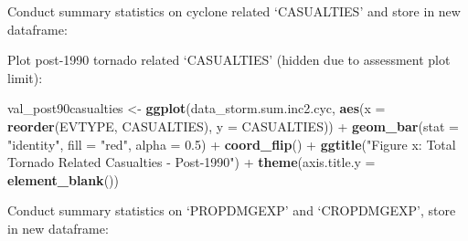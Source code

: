 \documentclass[]{article}
\newenvironment{Shaded}{\begin{snugshade}}{\end{snugshade}}
\newcommand{\KeywordTok}[1]{\textcolor[rgb]{0.13,0.29,0.53}{\textbf{{#1}}}}
\newcommand{\DataTypeTok}[1]{\textcolor[rgb]{0.13,0.29,0.53}{{#1}}}
\newcommand{\DecValTok}[1]{\textcolor[rgb]{0.00,0.00,0.81}{{#1}}}
\newcommand{\FloatTok}[1]{\textcolor[rgb]{0.00,0.00,0.81}{{#1}}}
\newcommand{\StringTok}[1]{\textcolor[rgb]{0.31,0.60,0.02}{{#1}}}
\newcommand{\OtherTok}[1]{\textcolor[rgb]{0.56,0.35,0.01}{{#1}}}
\newcommand{\NormalTok}[1]{{#1}}
\begin{document}
Conduct summary statistics on cyclone related `CASUALTIES' and store in
new dataframe:

\begin{Shaded}
\end{Shaded}

Plot post-1990 tornado related `CASUALTIES' (hidden due to assessment
plot limit):

\begin{Shaded}
\begin{Highlighting}[]
\NormalTok{val_post90casualties <-}\StringTok{ }\KeywordTok{ggplot}\NormalTok{(data_storm.sum.inc2.cyc, }\KeywordTok{aes}\NormalTok{(}\DataTypeTok{x =} \KeywordTok{reorder}\NormalTok{(EVTYPE, CASUALTIES), }\DataTypeTok{y =} \NormalTok{CASUALTIES)) +}
\StringTok{  }\KeywordTok{geom_bar}\NormalTok{(}\DataTypeTok{stat =} \StringTok{"identity"}\NormalTok{, }\DataTypeTok{fill =} \StringTok{"red"}\NormalTok{, }\DataTypeTok{alpha =} \FloatTok{0.5}\NormalTok{) +}
\StringTok{  }\KeywordTok{coord_flip}\NormalTok{() +}
\StringTok{  }\KeywordTok{ggtitle}\NormalTok{(}\StringTok{"Figure x: Total Tornado Related Casualties - Post-1990"}\NormalTok{) +}
\StringTok{  }\KeywordTok{theme}\NormalTok{(}\DataTypeTok{axis.title.y =} \KeywordTok{element_blank}\NormalTok{())}
\end{Highlighting}
\end{Shaded}

Conduct summary statistics on `PROPDMGEXP' and `CROPDMGEXP', store in
new dataframe:
\end{document}
